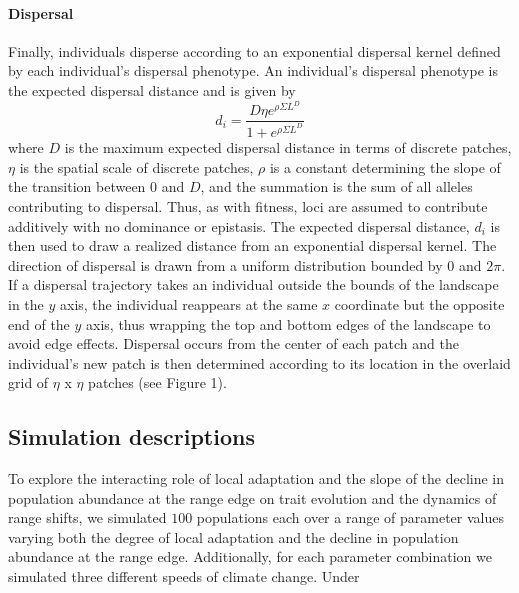 \documentclass[11pt, oneside]{article}
\begin{document}
\paragraph{Dispersal}
Finally, individuals disperse according to an exponential dispersal kernel defined by each individual's dispersal phenotype. An individual's dispersal phenotype is the expected dispersal distance and is given by
\begin{equation}
d_{i} = \frac{D\eta e^{\rho\Sigma L^{D}}}{1+e^{\rho\Sigma L^{D}}} 
\end{equation}
where $D$ is the maximum expected dispersal distance in terms of discrete patches, $\eta$ is the spatial scale of discrete patches, $\rho$ is a constant determining the slope of the transition between $0$ and $D$, and the summation is the sum of all alleles contributing to dispersal. Thus, as with fitness, loci are assumed to contribute additively with no dominance or epistasis. The expected dispersal distance, $d_{i}$ is then used to draw a realized distance from an exponential dispersal kernel. The direction of dispersal is drawn from a uniform distribution bounded by $0$ and $2\pi$. If a dispersal trajectory takes an individual outside the bounds of the landscape in the $y$ axis, the individual reappears at the same $x$ coordinate but the opposite end of the $y$ axis, thus wrapping the top and bottom edges of the landscape to avoid edge effects. Dispersal occurs from the center of each patch and the individual's new patch is then determined according to its location in the overlaid grid of $\eta$ x $\eta$ patches (see Figure 1).

\subsection{Simulation descriptions}
To explore the interacting role of local adaptation and the slope of the decline in population abundance at the range edge on trait evolution and the dynamics of range shifts, we simulated $100$ populations each over a range of parameter values varying both the degree of local adaptation and the decline in population abundance at the range edge. Additionally, for each parameter combination we simulated three different speeds of climate change. Under 

%
%
\end{document}
